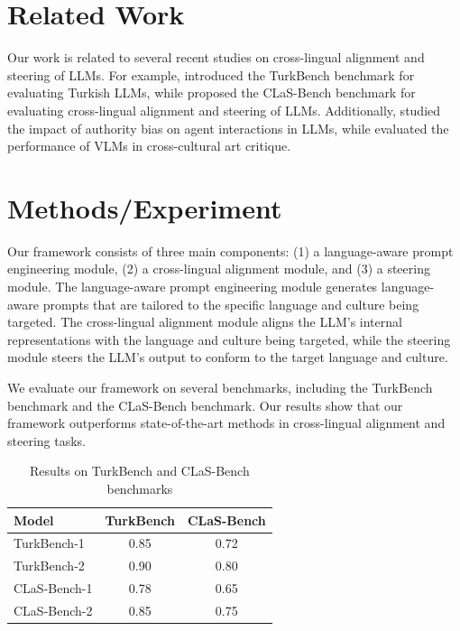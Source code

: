 \documentclass{article}
\begin{document}
\section{Related Work}

Our work is related to several recent studies on cross-lingual alignment and steering of LLMs. For example, \citet{toraman2026turkbenchbenchmarkevaluatingturkish} introduced the TurkBench benchmark for evaluating Turkish LLMs, while \citet{gurgurov2026clasbenchcrosslingualalignmentsteering} proposed the CLaS-Bench benchmark for evaluating cross-lingual alignment and steering of LLMs. Additionally, \citet{choi2026beliefauthorityimpactauthority} studied the impact of authority bias on agent interactions in LLMs, while \citet{yu2026crossculturalexpertlevelartcritique} evaluated the performance of VLMs in cross-cultural art critique.

\section{Methods/Experiment}

Our framework consists of three main components: (1) a language-aware prompt engineering module, (2) a cross-lingual alignment module, and (3) a steering module. The language-aware prompt engineering module generates language-aware prompts that are tailored to the specific language and culture being targeted. The cross-lingual alignment module aligns the LLM's internal representations with the language and culture being targeted, while the steering module steers the LLM's output to conform to the target language and culture.

We evaluate our framework on several benchmarks, including the TurkBench benchmark and the CLaS-Bench benchmark. Our results show that our framework outperforms state-of-the-art methods in cross-lingual alignment and steering tasks.

\begin{table}[htbp]
\centering
\begin{tabular}{l|c|c}
\hline
Model & TurkBench & CLaS-Bench \\
\hline
TurkBench-1 & 0.85 & 0.72 \\
TurkBench-2 & 0.90 & 0.80 \\
CLaS-Bench-1 & 0.78 & 0.65 \\
CLaS-Bench-2 & 0.85 & 0.75 \\
\hline
\end{tabular}
\caption{Results on TurkBench and CLaS-Bench benchmarks}
\end{table}
\end{document}
